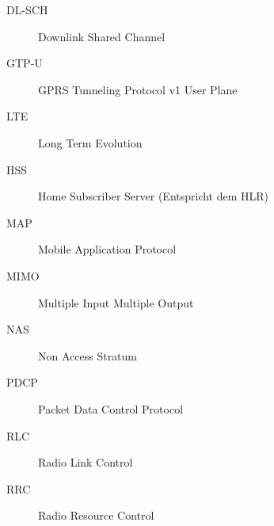 \documentclass[10pt,a4paper]{scrartcl}
\begin{document}
\begin{description}
	\item[DL-SCH] Downlink Shared Channel
	\item[GTP-U] GPRS Tunneling Protocol v1 User Plane
	\item[LTE] Long Term Evolution
	\item[HSS] Home Subscriber Server (Entspricht dem HLR)
	\item[MAP] Mobile Application Protocol
	\item[MIMO] Multiple Input Multiple Output
	\item[NAS] Non Access Stratum
	\item[PDCP] Packet Data Control Protocol
	\item[RLC] Radio Link Control
	\item[RRC] Radio Resource Control
\end{description}
\end{document}
